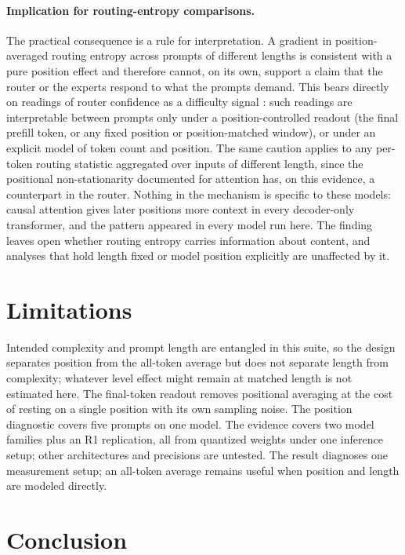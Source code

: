 \documentclass[10pt,twocolumn]{article}
\begin{document}
\paragraph{Implication for routing-entropy comparisons.}
The practical consequence is a rule for interpretation. A gradient in
position-averaged routing entropy across prompts of different lengths is
consistent with a pure position effect and therefore cannot, on its own,
support a claim that the router or the experts respond to what the prompts
demand. This bears directly on readings of router confidence as a difficulty
signal \citep{huang2024harder,raposo2024mixture}: such readings are
interpretable between prompts only under a position-controlled readout
(the final prefill token, or any fixed position or position-matched window),
or under an explicit model of token count and position. The same caution
applies to any per-token routing statistic aggregated over inputs of
different length, since the positional non-stationarity documented for
attention \citep{xiao2024streaming} has, on this evidence, a counterpart in
the router. Nothing in the mechanism is specific to these models: causal
attention gives later positions more context in every decoder-only
transformer, and the pattern appeared in every model run here. The finding
leaves open whether routing entropy carries information about
content, and analyses that hold length fixed or model position explicitly
are unaffected by it.

\section{Limitations}
\label{sec:limits}

Intended complexity and prompt length are entangled in this suite, so the
design separates position from the all-token average but does not separate
length from complexity; whatever level effect might remain at matched length
is not estimated here. The final-token readout removes positional averaging
at the cost of resting on a single position with its own sampling noise. The
position diagnostic covers five prompts on one model. The evidence covers
two model families plus an R1 replication, all from quantized weights under
one inference setup; other architectures and precisions are untested. The
result diagnoses one measurement setup; an all-token average remains useful
when position and length are modeled directly.

\section{Conclusion}
\label{sec:conc}
\end{document}
